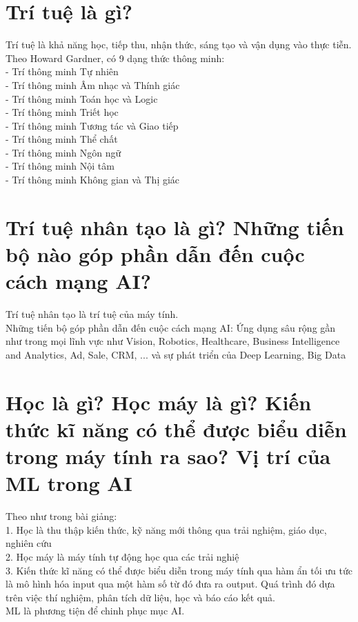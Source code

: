 \documentclass{article}
\begin{document}
\section{Trí tuệ là gì?}
Trí tuệ là khả năng học, tiếp thu, nhận thức, sáng tạo và vận dụng vào thực tiễn. \\[0.2cm]
Theo Howard Gardner, có 9 dạng thức thông minh: \\[0.2cm]
- Trí thông minh Tự nhiên \\ [0.1cm]
- Trí thông minh Âm nhạc và Thính giác \\[0.1cm]
- Trí thông minh Toán học và Logic \\[0.1cm]
- Trí thông minh Triết học \\[0.1cm]
- Trí thông minh Tương tác và Giao tiếp \\[0.1cm]
- Trí thông minh Thể chất \\[0.1cm]
- Trí thông minh Ngôn ngữ \\[0.1cm]
- Trí thông minh Nội tâm \\[0.1cm]
- Trí thông minh Không gian và Thị giác

\section{Trí tuệ nhân tạo là gì? Những tiến bộ nào góp phần dẫn đến cuộc cách mạng AI?}
Trí tuệ nhân tạo là trí tuệ của máy tính.\\[0.2cm]
Những tiến bộ góp phần dẫn đến cuộc cách mạng AI: Ứng dụng sâu rộng gần\\[0.1cm] như trong mọi lĩnh vực như Vision, Robotics, Healthcare, Business Intelligence\\[0.1cm] and Analytics, Ad, Sale, CRM, ... và sự phát triển của Deep Learning, Big Data

\section{Học là gì? Học máy là gì? Kiến thức kĩ năng có thể được biểu diễn trong máy tính ra sao? Vị trí của ML trong AI}
Theo như trong bài giảng:\\[0.2cm]
1. Học là thu thập kiến thức, kỹ năng mới thông qua trải nghiệm, giáo dục, nghiên cứu\\[0.1cm]
2. Học máy là máy tính tự động học qua các trải nghiệ\\[0.1cm]
3. Kiến thức kĩ năng có thể được biểu diễn trong máy tính qua hàm ẩn tối ưu tức là mô hình hóa input qua một hàm số từ đó đưa ra output. Quá trình đó dựa trên việc thí nghiệm, phân tích dữ liệu, học và báo cáo kết quả.\\[0.2cm]
 ML là phương tiện để chinh phục mục AI.
\end{document}
